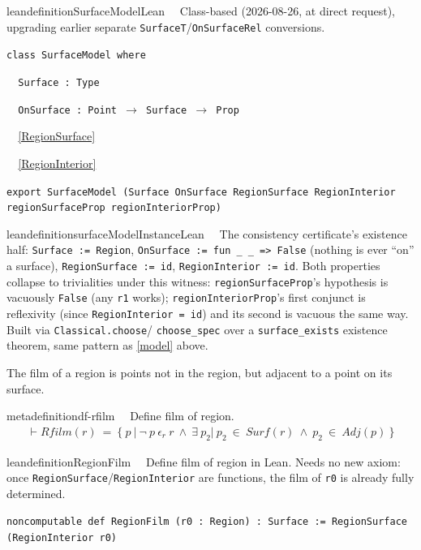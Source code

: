 \begin{restatable}{leandefinition}{SurfaceModelLean}~~ Class-based (2026-08-26, at
direct request), upgrading earlier separate \texttt{SurfaceT}/\texttt{OnSurfaceRel} conversions.

\texttt{\textcolor{leancolor}{class} \textcolor{leanyellow}{SurfaceModel} \textcolor{leancolor}{where}}

\texttt{~~Surface : Type}

\texttt{~~OnSurface : Point $\to$ Surface $\to$ Prop}

\texttt{~~}\ref{RegionSurface}

\texttt{~~}\ref{RegionInterior}

\texttt{\textcolor{leancolor}{export} SurfaceModel (Surface OnSurface RegionSurface RegionInterior regionSurfaceProp regionInteriorProp)}
\label{SurfaceModel}
\end{restatable}

\begin{restatable}{leandefinition}{surfaceModelInstanceLean}~~ The
consistency certificate's existence half: \texttt{Surface := Region}, \texttt{OnSurface := fun \_ \_ =>
False} (nothing is ever ``on'' a surface), \texttt{RegionSurface := id}, \texttt{RegionInterior := id}. Both
properties collapse to trivialities under this witness: \texttt{regionSurfaceProp}'s hypothesis is vacuously
\texttt{False} (any \texttt{r1} works); \texttt{regionInteriorProp}'s first conjunct is reflexivity (since
\texttt{RegionInterior = id}) and its second is vacuous the same way. Built via \texttt{Classical.choose}/
\texttt{choose\_spec} over a \texttt{surface\_exists} existence theorem, same pattern as \ref{model} above.
\label{surfaceModelInstance}
\end{restatable}

\pn The film of a region is points not in the region, but adjacent to a point on its surface.

\begin{restatable}{metadefinition}{df-rfilm}~~ Define film of region.
\begin{align}
\vdash \textit{Rfilm}(r)~=~ \{~p~\vert~\lnot~p~\epsilon_r~r~\wedge~\exists~p_2\vert~p_2~\in~\textit{Surf}(r)~\wedge~p_2~\in~\textit{Adj}(p)~ \}
\label{eq:df-rfilm}\tag{df-rfilm}
\end{align}
\end{restatable}

\begin{restatable}{leandefinition}{RegionFilm}~~ Define film of region in Lean. Needs no
new axiom: once \texttt{RegionSurface}/\texttt{RegionInterior} are functions, the film of \texttt{r0} is
already fully determined.

\texttt{\textcolor{leancolor}{noncomputable def} \textcolor{leanyellow}{RegionFilm} (r0 : Region) : Surface := RegionSurface (RegionInterior r0)}
\label{RegionFilm}
\end{restatable}

